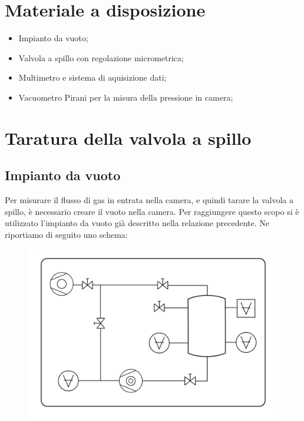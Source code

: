 \documentclass[11pt]{article}
\begin{document}
\section{Materiale a disposizione}
\begin{itemize}
\item Impianto da vuoto;
\item Valvola a spillo con regolazione micrometrica;
\item Multimetro e sistema di aquisizione dati;
\item Vacuometro Pirani per la misura della pressione in camera;
\end{itemize}

\section{Taratura della valvola a spillo}
\subsection{Impianto da vuoto}
Per misurare il flusso di gas in entrata nella camera, e quindi tarare la valvola a spillo, è necessario creare il vuoto nella camera. Per raggiungere questo scopo si è utilizzato l'impianto da vuoto già descritto nella relazione precedente. Ne riportiamo di seguito uno schema:
\vspace{-10 pt} 
 \begin{center} 
\begin{figure}[H]
\hspace{-30.5pt}
\includegraphics[scale=0.4]{schema_finale.png}
\caption{}
\label{}
\end{figure}
\end{center}
\end{document}
